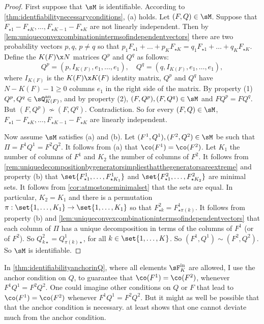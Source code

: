 \documentclass[12pt,a4paper]{article}
\begin{document}
\begin{proof}
First suppose that  $\sM$ is  identifiable. According to \cref{thm:identfiabilitynecessaryconditions}, (a) holds. Let $(F,Q)\in\sM$. %
Suppose that $F_{\star1}-F_{\star K},\ldots,F_{\star K-1}-F_{\star K}$ are not linearly independent. Then by \cref{lem:uniqueconvexcombinationintermsofindependentvectors} there are two probability vectors $p,q$, $p\neq q$ so that $p_1F_{\star 1}+ \ldots+p_KF_{\star K}=q_1F_{\star 1}+ \ldots+q_KF_{\star K}$.
Define the $K(F)\x N$ matrices $Q^p$ and $Q^q$ as follows: 
\[
Q^p = (p, I_{K(F)}, e_1,\ldots,e_1), \quad Q^q= (q, I_{K(F)}, e_1,\ldots,e_1),
\]
where $I_{K(F)}$ is the $K(F)\x K(F)$ identity matrix, $Q^p$ and $Q^q$ have $N-K(F)-1\ge 0$ columns $e_1$ in the right side of the matrix. By property (1) $Q^p,Q^q\in \sQ_{K(F)}^{\text{an}}$, and by property (2), $(F,Q^p),(F,Q^q)\in \sM$ and $FQ^p=FQ^q$. But $(F,Q^p)\not \sim (F,Q^q)$. Contradiction. So for every $(F,Q)\in\sM$, $F_{\star1}-F_{\star K},\ldots, F_{\star K-1}-F_{\star K}$ are linearly independent. 

Now assume $\sM$ satisfies (a) and (b). Let $(F^1,Q^1),(F^2,Q^2)\in \sM$ be such that $\Pi= F^1Q^1=F^2Q^2$. It follows from (a) that $\co(F^1)=\co(F^2)$. Let $K_1$ the number of columns of $F^1$ and $K_2$ the number of columns of $F^2$.  It follows from \cref{rem:uniquedecompositionbygeneratorsimpliesthatthegeneratorsareextreme} and property (b) that $\set{F^1_{\star 1},\ldots,F^1_{\star K_1}}$  and  $\set{F^2_{\star 1},\ldots,F^2_{\star K_2}}$ are minimal sets. It follows from \cref{cor:atmostoneminimalset} that the sets are equal. In particular, $K_2=K_1$ and there is a permutation $\pi:\set{1,\ldots,K_1}\to \set{1,\ldots, K_1}$ so that $F_{\star k}^2 = F^1_{\star \pi(k)}$. It follows from property (b) and \cref{lem:uniqueconvexcombinationintermsofindependentvectors} that each  column of $\Pi$ has a unique decomposition in terms of the columns of $F^1$ (or of $F^2$). So $Q^2_{k\star}=Q^1_{\pi(k)\star}$, for all $k\in\set{1,\ldots,K}$. So $(F^1,Q^1)\sim (F^2,Q^2)$. So $\sM$ is identifiable.  
\end{proof}
  
 In \cref{thm:identifiabilityanchorinQ}, where all elements $\sF_K^{\text{in}}$ are allowed,
 I use the anchor condition on 
 $Q$, to guarantee that $\co(F^1)=\co(F^2)$, whenever 
 $F^1Q^1=F^2Q^2$. One could 
 imagine other conditions on $Q$ 
 or $F$ that lead to $\co(F^1)=\co(F^2)$ whenever 
 $F^1Q^1=F^2Q^2$. But it might 
 as well be possible that that the 
 anchor condition is necessary. 
 at least 
shows that one cannot deviate much from the anchor condition. 
\end{document}
